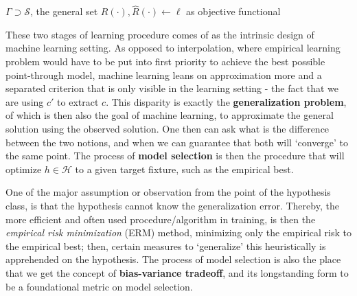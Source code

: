 \begin{algorithm}[htb]
    \renewcommand{\algorithmcfname}{Optimization problem}
    \caption{Empirical-generalization learning dynamics (non-proxy)}
    \Begin
    {
        $\Gamma\supset \mathcal{S}$, the general set\;
        $R(\cdot),\hat{R}(\cdot)\gets\ell$ as objective functional\;
    }
    \label{algo:algo_optim_ideal}
\end{algorithm}

These two stages of learning procedure comes of as the intrinsic design of machine learning setting. As opposed to interpolation, where empirical learning problem would have to be put into first priority to achieve the best possible point-through model, machine learning leans on approximation more and a separated criterion that is only visible in the learning setting - the fact that we are using $c'$ to extract $c$. This disparity is exactly the \textbf{generalization problem}, of which is then also the goal of machine learning, to approximate the general solution using the observed solution. One then can ask what is the difference between the two notions, and when we can guarantee that both will `converge' to the same point. The process of \textbf{model selection} is then the procedure that will optimize $h\in \mathcal{H}$ to a given target fixture, such as the empirical best. 

One of the major assumption or observation from the point of the hypothesis class, is that the hypothesis cannot know the generalization error. Thereby, the more efficient and often used procedure/algorithm in training, is then the \textit{empirical risk minimization} (ERM) method, minimizing only the empirical risk to the empirical best; then, certain measures to `generalize' this heuristically is apprehended on the hypothesis. The process of model selection is also the place that we get the concept of \textbf{bias-variance tradeoff}, and its longstanding form to be a foundational metric on model selection. 

